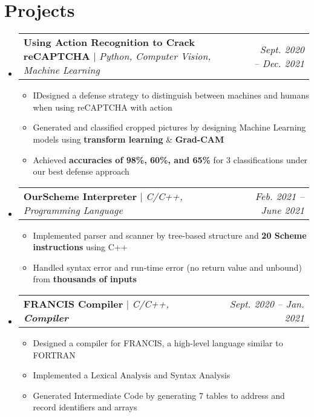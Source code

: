 \documentclass[letterpaper,11pt]{article}
\makeatletter
\newcommand{\HL}[1]{
  \textbf{\textcolor{DukeBlue}{#1}}
}
\newcommand{\subheadingtitlevspace}{
\vspace{-3pt}
}
\newcommand{\resumeItem}[1]{
  \item{
    {#1 \vspace{-4pt}}
  }
}
\newcommand{\titleItem}[1]{
  \textbf{#1}
}
\newcommand{\resumeProjectHeading}[2]{
    \item
    \begin{tabular*}{0.97\textwidth}{l@{\extracolsep{\fill}}r}
      #1 & \textit{ #2} \\
    \end{tabular*}\vspace{-9pt}
}
\newcommand{\resumeSubHeadingListStart}{\subheadingtitlevspace\begin{itemize}[leftmargin=0.15in, label={}]}
\newcommand{\resumeSubHeadingListEnd}{\end{itemize}}
\newcommand{\resumeItemListStart}{
\begin{itemize}}
\newcommand{\resumeItemListEnd}{
\end{itemize}\vspace{-8pt}}
\makeatother
\begin{document}
 \section{Projects}    
  \resumeSubHeadingListStart
    \resumeProjectHeading
        {\titleItem{Using Action Recognition to Crack reCAPTCHA} $|$ \emph{Python, Computer Vision, Machine Learning}}{Sept. 2020 -- Dec. 2021}
        \resumeItemListStart
        \resumeItem{IDesigned a defense strategy to distinguish between machines and humans when using reCAPTCHA with action}
        \resumeItem{Generated and classified cropped pictures by designing Machine Learning models using \HL{transform learning}\&\HL{Grad-CAM}}
        \resumeItem{Achieved \HL{accuracies of 98\%, 60\%, and 65\%} for 3 classifications under our best defense approach }
        \resumeItemListEnd
    \resumeProjectHeading
        {\titleItem{OurScheme Interpreter} $|$ \emph{C/C++, Programming Language}}{Feb. 2021 -- June 2021}
        \resumeItemListStart
        \resumeItem{Implemented parser and scanner by tree-based structure and \HL{20 Scheme instructions} using C++} 
        \resumeItem{Handled syntax error and run-time error (no return value and unbound) from \HL{thousands of inputs}}
        \resumeItemListEnd
    \resumeProjectHeading
        {\titleItem{FRANCIS Compiler} $|$ \emph{C/C++, \HL{Compiler}}}{Sept. 2020 -- Jan. 2021}
        \resumeItemListStart
        \resumeItem{Designed a compiler for FRANCIS, a high-level language similar to FORTRAN}
        \resumeItem{Implemented a Lexical Analysis and Syntax Analysis}
        \resumeItem{Generated Intermediate Code by generating 7 tables to address and record identifiers and arrays}
        \resumeItemListEnd
  \resumeSubHeadingListEnd


\end{document}
